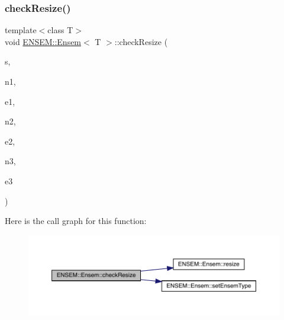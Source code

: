 \subsubsection{\texorpdfstring{checkResize()}{checkResize()}\hspace{0.1cm}{\footnotesize\ttfamily [5/6]}}
{\footnotesize\ttfamily template$<$class T$>$ \\
void \mbox{\hyperlink{classENSEM_1_1Ensem}{E\+N\+S\+E\+M\+::\+Ensem}}$<$ T $>$\+::check\+Resize (\begin{DoxyParamCaption}\item[{const char $\ast$}]{s,  }\item[{int}]{n1,  }\item[{\mbox{\hyperlink{namespaceENSEM_a2dc2c4a26884f343471e52f23479ddbe}{Ensem\+Type\+\_\+t}}}]{e1,  }\item[{int}]{n2,  }\item[{\mbox{\hyperlink{namespaceENSEM_a2dc2c4a26884f343471e52f23479ddbe}{Ensem\+Type\+\_\+t}}}]{e2,  }\item[{int}]{n3,  }\item[{\mbox{\hyperlink{namespaceENSEM_a2dc2c4a26884f343471e52f23479ddbe}{Ensem\+Type\+\_\+t}}}]{e3 }\end{DoxyParamCaption})\hspace{0.3cm}{\ttfamily [inline]}}

Here is the call graph for this function\+:
\nopagebreak
\begin{figure}[H]
\begin{center}
\leavevmode
\includegraphics[width=350pt]{d7/d3e/classENSEM_1_1Ensem_a893d2925ef3c942b9d25b0a6e6db619c_cgraph}
\end{center}
\end{figure}
\mbox{\label{classENSEM_1_1Ensem_a893d2925ef3c942b9d25b0a6e6db619c}} 
